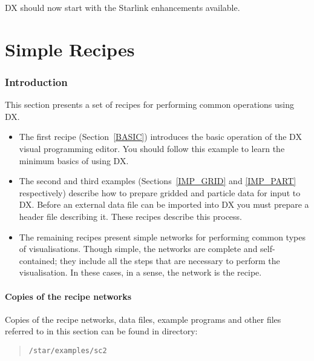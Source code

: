 DX should now start with the Starlink enhancements available.


\cleardoublepage
\markboth{\stardocname}{\stardocname}
\part{Simple Recipes}
\markboth{\stardocname}{\stardocname}
\section{Introduction}

This section presents a set of recipes for performing common operations
using DX.

\begin{itemize}

  \item The first recipe (Section~\ref{BASIC}) introduces the basic
   operation of the DX visual programming editor. You should follow this
   example to learn the minimum basics of using DX.

  \item The second and third examples (Sections~\ref{IMP_GRID} and
   \ref{IMP_PART} respectively) describe how to prepare gridded and
   particle data for input to DX. Before an external data file can be
   imported into DX you must prepare a header file describing it. These
   recipes describe this process.

  \item The remaining recipes present simple networks for performing
   common types of visualisations. Though simple, the networks are
   complete and self-contained; they include all the steps that are
   necessary to perform the visualisation. In these cases, in a sense,
   the network is the recipe.

\end{itemize}

\subsection{Copies of the recipe networks}

Copies of the recipe networks, data files, example programs and other
files referred to in this section can be found in directory:

\begin{quote}
{\tt /star/examples/sc2}
\end{quote}


